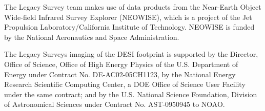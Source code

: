 \documentclass[twocolumn,tighten]{aastex631}
\begin{document}
\begin{CJK*}{UTF8}{gbsn}
The Legacy Survey team makes use of data products from the Near-Earth Object Wide-field Infrared Survey Explorer (NEOWISE), which is a project of the Jet Propulsion Laboratory/California Institute of Technology. NEOWISE is funded by the National Aeronautics and Space Administration.

The Legacy Surveys imaging of the DESI footprint is supported by the Director, Office of Science, Office of High Energy Physics of the U.S. Department of Energy under Contract No. DE-AC02-05CH1123, by the National Energy Research Scientific Computing Center, a DOE Office of Science User Facility under the same contract; and by the U.S. National Science Foundation, Division of Astronomical Sciences under Contract No. AST-0950945 to NOAO.




{}



\end{CJK*}
\end{document}
